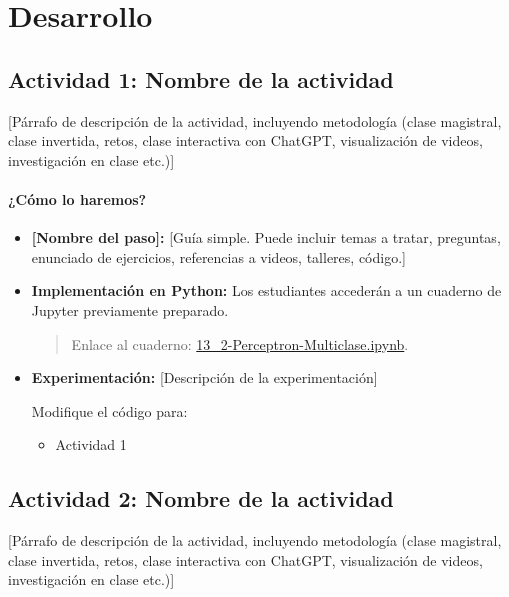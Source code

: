 \documentclass[a4,11pt]{aleph-notas}
\begin{document}
\section*{Desarrollo}

\subsection*{Actividad 1: Nombre de la actividad}

[Párrafo de descripción de la actividad, incluyendo metodología (clase magistral, clase invertida, retos, clase interactiva con ChatGPT, visualización de videos, investigación en clase etc.)]

\paragraph{¿Cómo lo haremos?}  
\begin{itemize}[leftmargin=*]
    \item \textbf{[Nombre del paso]:}  %
    [Guía simple. Puede incluir temas a tratar, preguntas, enunciado de ejercicios, referencias a videos, talleres, código.]
    \item \textbf{Implementación en Python:} Los estudiantes accederán a un cuaderno de Jupyter previamente preparado.
    \begin{quote}
        Enlace al cuaderno: \href{https://github.com/andres-merino/AprendizajeAutomaticoInicial-05-N0105/blob/main/2-Notebooks/13_2-Perceptron-Multiclase.ipynb}{13\_2-Perceptron-Multiclase.ipynb}.
    \end{quote}
    \item \textbf{Experimentación:} 
    [Descripción de la experimentación]
    \begin{ejer}
    Modifique el código para:
    \begin{itemize}[leftmargin=*]
        \item Actividad 1
    \end{itemize}
    \end{ejer}
\end{itemize}

\subsection*{Actividad 2: Nombre de la actividad}

[Párrafo de descripción de la actividad, incluyendo metodología (clase magistral, clase invertida, retos, clase interactiva con ChatGPT, visualización de videos, investigación en clase etc.)]
\end{document}

